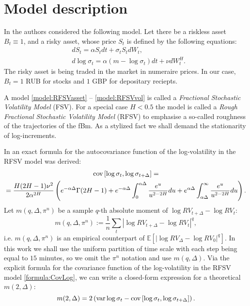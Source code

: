 

\section{Model description}
    In \cite{GatheralRosenbaum2014} the authors considered the following model. 
    Let there be a riskless asset $B_t \equiv 1$, and a risky asset, whose price $S_t$ is defined 
    by the following equations: 
    \begin{align}
        & dS_t          = \alpha S_t dt + \sigma_t S_tdW_t,               \label{model:RFSVasset} \\
        & d\log\sigma_t = \alpha (m - \log\sigma_t) dt + \nu dW_t^H.      \label{model:RFSVvol}
    \end{align}
    The risky asset is being traded in the market in numeraire prices. In our case, $B_t = 1$ RUB for stocks and $1$ GBP for depositary reciepts.
    \begin{definition}
        A model \eqref{model:RFSVasset} -- \eqref{model:RFSVvol} is called a 
        \emph{Fractional Stochastic Volatility Model} (FSV). For a special case $H < 0.5$ the 
        model is called a \emph{Rough Fractional Stochastic Volatility Model} (RFSV) to emphasise a 
        so-called roughness of the trajectories of the fBm. 
        As a stylized fact we shall demand the stationarity of log-increments.
    \end{definition}

    In \cite{Cheridito2003} an exact formula for the autocovariance function of the log-volatility in the RFSV model was derived:
    \begin{multline}\label{formula:CovLog}
        \operatorname*{cov}\left[\log \sigma_{t}, \log \sigma_{t+\Delta}\right] =\\= \frac{H(2H-1)\nu^2}{2\alpha^{2H}}\left(e^{-\alpha\Delta} \Gamma(2H-1) + e^{-\alpha\Delta} \int_{0}^{\alpha\Delta}\frac{e^u}{u^{2-2H}}du + e^{\alpha\Delta} \int_{\alpha\Delta}^{\infty}\frac{e^u}{u^{2-2H}}du\right).
    \end{multline}
    Let $m(q, \Delta, \pi^n)$ be a sample $q$-th absolute moment of $\log RV_{t+\Delta} - \log RV_t$:
    \begin{equation}
        m(q, \Delta, \pi^n) := \frac{1}{n} \sum_{t} \left|\log RV_{t + \Delta} - \log RV_t\right|^q,
    \end{equation}
    i.e. $m(q, \Delta, \pi^n)$ is an empirical counterpart of $\mathbb{E}\left[\left|\log RV_{\Delta} - \log RV_0\right|^q\right]$.
    In this work we shall use the uniform partition of time scale with each step being equal to $15$ minutes, so we omit the $\pi^n$ notation and use $m(q, \Delta)$.
    Via the explicit formula for the covariance function of the log-volatility in the RFSV model \eqref{formula:CovLog}, we can write 
    a closed-form expression for a theoretical $m(2, \Delta)$:
    \begin{equation}
        m(2, \Delta) = 2\left(\operatorname*{var} \log\sigma_{t} - \operatorname*{cov}\left[\log\sigma_{t}, \log\sigma_{t+\Delta}\right]\right).
    \end{equation}
